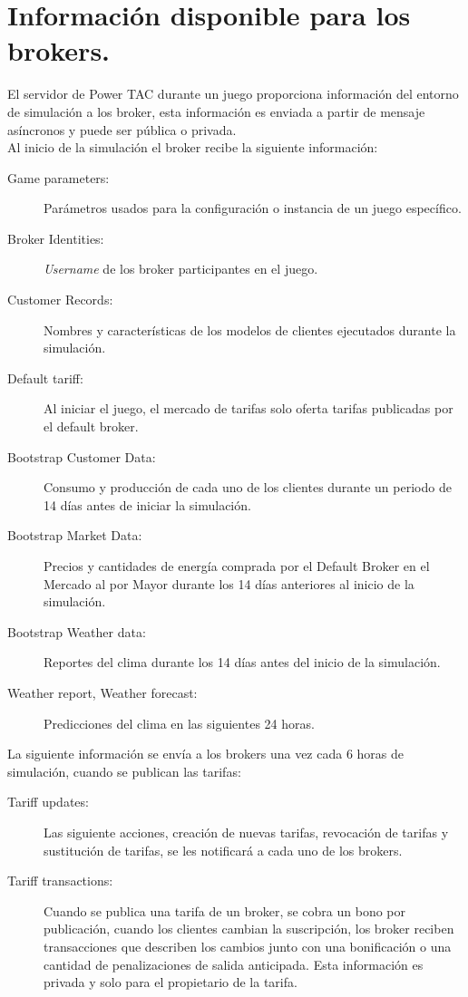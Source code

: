 \section{Información disponible para los brokers.}

El servidor de Power TAC durante un juego proporciona información del entorno de simulación a los broker, esta información es enviada a partir de mensaje  asíncronos y puede ser pública o privada.\\

Al inicio de la simulación el broker recibe la siguiente información:
\begin{description}
	\item [Game parameters: ]Parámetros usados para la configuración o instancia de un juego específico.    
	\item [Broker Identities: ]\textit{Username} de los broker participantes en el juego.
	\item [Customer Records: ]Nombres y características de los modelos de clientes ejecutados durante la simulación.
	\item [Default tariff: ]Al iniciar el juego, el mercado de tarifas solo oferta tarifas publicadas por el default broker.
	\item [Bootstrap Customer Data: ]Consumo y producción de cada uno de los clientes durante un periodo de 14 días antes de iniciar la simulación.
	\item [Bootstrap Market Data: ]Precios y cantidades de energía comprada por el Default Broker en el Mercado al por Mayor durante los 14 días anteriores al inicio de la simulación.
	\item [Bootstrap Weather data: ]Reportes del clima durante los 14 días antes del inicio de la simulación.
	\item [Weather report, Weather forecast: ]Predicciones del clima en las siguientes 24 horas.  
\end{description}
La siguiente información se envía a los brokers una vez cada 6 horas de simulación, cuando se publican las tarifas:
\begin{description}
	\item [Tariff updates: ]Las siguiente acciones, creación de nuevas tarifas, revocación de tarifas y sustitución de tarifas, se les notificará a cada uno de los brokers.
	\item [Tariff transactions:] Cuando se publica una tarifa de un broker, se  cobra un bono por publicación, cuando los clientes  cambian la suscripción, los broker reciben transacciones que describen los cambios junto con una bonificación o una cantidad de penalizaciones de salida anticipada. Esta información es privada y solo para el propietario de la tarifa.
\end{description}
